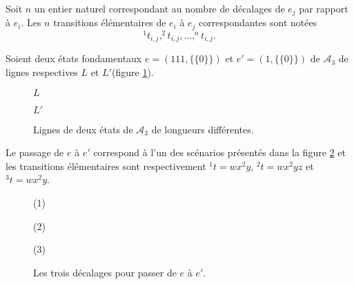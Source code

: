  Soit $n$ un entier naturel correspondant au nombre de décalages de  $e_{j}$ par rapport à $e_{i}$. Les $n$ transitions élémentaires de $e_{i}$ à $e_{j}$ correspondantes sont notées $$^{1}t_{i,j}, ^{2}t_{i,j}, ..., ^{n}t_{i,j}.$$
\begin{Ex}\label{ex10} 
Soient deux états fondamentaux $e = (111,\{\{0\}\})$ et $e'=(1,\{\{0\}\})$ de $\mathcal{A}_{3}$  de lignes respectives $L$ et $L'$(figure \ref{Atfig13}).
\begin{figure}[!htb]
\begin{minipage}[c]{.43\linewidth}
        \centering
\end{minipage}\hfill
\begin{minipage}[c]{.36\linewidth}
        \centering
$L$\begin{logicpuzzle}[rows=1,columns=3,color=cyan!100, width=750px,scale=0.5]
\end{logicpuzzle}
\end{minipage}
\hfill
\begin{minipage}[c]{.36\linewidth}
        \centering
$L'$\begin{logicpuzzle}[rows=1,columns=1,color=cyan!100, width=750px,scale=0.5]
\end{logicpuzzle}
\end{minipage}
\caption{\label{Atfig13}  Lignes de deux états de $\mathcal{A}_{3}$ de longueurs différentes.}
\end{figure}
Le passage de $e$ à $e'$  correspond à l'un des scénarios présentés dans la figure \ref{Atfig14} et les transitions élémentaires sont respectivement $^{1}t=wx^{2}y$, $^{2}t=wx^{2}yz$ et $^{3}t=wx^{2}y$.
\begin{figure}[!htb]
\begin{minipage}[c]{.26\linewidth}
        \centering
(1)\begin{logicpuzzle}[rows=2,columns=3,color=cyan!100, width=750px,scale=0.5]
\end{logicpuzzle}
\end{minipage}
\hfill
\begin{minipage}[c]{.26\linewidth}
        \centering
(2)\begin{logicpuzzle}[rows=2,columns=3,color=cyan!100, width=750px,scale=0.5]
\end{logicpuzzle}
\end{minipage}
\hfill
\begin{minipage}[c]{.26\linewidth}
        \centering
(3)\begin{logicpuzzle}[rows=2,columns=3,color=cyan!100, width=750px,scale=0.5]
\end{logicpuzzle}
\end{minipage}
\caption{\label{Atfig14} Les trois décalages pour passer de $e$ à $e'$.}
\end{figure}

\end{Ex}

